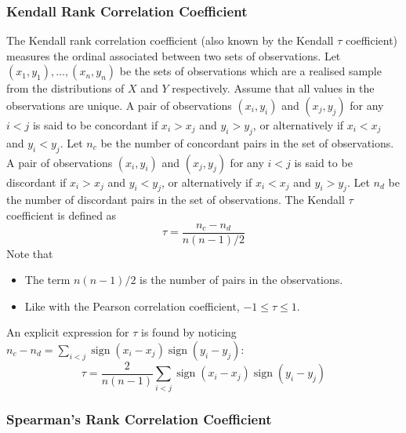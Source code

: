 \documentclass[11pt]{report} %
\begin{document}
\subsubsection{Kendall Rank Correlation Coefficient}

The Kendall rank correlation coefficient (also known by the Kendall $\tau$ coefficient) measures the ordinal associated between two sets of observations. Let $\left(x_{1}, y_{1}\right), \dots, \left(x_{n}, y_{n}\right)$ be the sets of observations which are a realised sample from the distributions of $X$ and $Y$ respectively. Assume that all values in the observations are unique. A pair of observations $\left(x_{i}, y_{i}\right)$ and $\left(x_{j}, y_{j}\right)$ for any $i < j$ is said to be concordant if $x_{i} > x_{j}$ and $y_{i} > y_{j}$, or alternatively if $x_{i} < x_{j}$ and $y_{i} < y_{j}$. Let $n_{c}$ be the number of concordant pairs in the set of observations. A pair of observations $\left(x_{i}, y_{i}\right)$ and $\left(x_{j}, y_{j}\right)$ for any $i < j$ is said to be discordant if $x_{i} > x_{j}$ and $y_{i} < y_{j}$, or alternatively if $x_{i} < x_{j}$ and $y_{i} > y_{j}$. Let $n_{d}$ be the number of discordant pairs in the set of observations. The Kendall $\tau$ coefficient is defined as
\begin{equation}
\tau = \dfrac{n_{c} - n_{d}}{n\left(n - 1\right)/2}
\end{equation}
Note that
\begin{itemize}
\item The term $n\left(n - 1\right)/2$ is the number of pairs in the observations.
\item Like with the Pearson correlation coefficient, $-1 \leq \tau \leq 1$.
\end{itemize}
An explicit expression for $\tau$ is found by noticing $n_{c} - n_{d} = \sum_{i < j}\operatorname{sign}\left(x_{i} - x_{j}\right)\operatorname{sign}\left(y_{i} - y_{j}\right)$:
\begin{equation}
\tau = \dfrac{2}{n\left(n - 1\right)}\sum_{i < j}\operatorname{sign}\left(x_{i} - x_{j}\right)\operatorname{sign}\left(y_{i} - y_{j}\right)
\end{equation}

\subsubsection{Spearman's Rank Correlation Coefficient}
\end{document}
